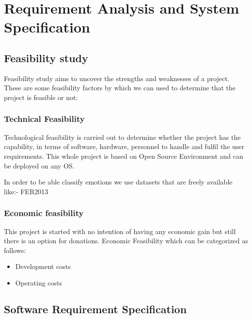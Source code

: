 \chapter{Requirement Analysis and System Specification}
\section{Feasibility study}
Feasibility study aims to uncover the strengths and weaknesses of a project. These are some feasibility factors by which we can used to determine that the project is feasible or not:
\subsection{Technical Feasibility}
Technological feasibility is carried out to determine whether the project has the capability, in terms of software, hardware, personnel to handle and fulfil the user requirements. This whole project is based on Open Source Environment and can be deployed on any OS. 

In order to be able classify emotions we use datasets that are freely available like:- FER2013
\subsection{Economic feasibility}
This project is started with no intention of having any economic gain but still there is an option for donations. Economic Feasibility which can be categorized as follows:
\begin{itemize}
	\item Development costs
	\item Operating costs
\end{itemize}

\section{Software Requirement Specification}

